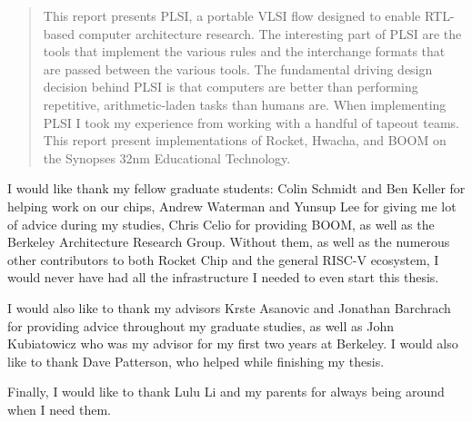\documentclass[masters2]{ucbthesis}
\begin{document}
\begin{frontmatter}

\tableofcontents
\clearpage
\listoffigures

\begin{abstract}
This report presents PLSI, a portable VLSI flow designed to enable RTL-based
computer architecture research.  The interesting part of PLSI are the tools
that implement the various rules and the interchange formats that are passed
between the various tools.  The fundamental driving design decision behind PLSI
is that computers are better than performing repetitive, arithmetic-laden tasks
than humans are.  When implementing PLSI I took my experience from working with
a handful of tapeout teams.  This report present implementations of Rocket,
Hwacha, and BOOM on the Synopses 32nm Educational Technology.
\end{abstract}

\begin{acknowledgements}
I would like thank my fellow graduate students: Colin Schmidt and Ben Keller
for helping work on our chips, Andrew Waterman and Yunsup Lee for giving me lot
of advice during my studies, Chris Celio for providing BOOM, as well as the
Berkeley Architecture Research Group.  Without them, as well as the numerous
other contributors to both Rocket Chip and the general RISC-V ecosystem, I
would never have had all the infrastructure I needed to even start this thesis.

I would also like to thank my advisors Krste Asanovic and Jonathan Barchrach
for providing advice throughout my graduate studies, as well as John
Kubiatowicz who was my advisor for my first two years at Berkeley.  I would
also like to thank Dave Patterson, who helped while finishing my thesis.

Finally, I would like to thank Lulu Li and my parents for always being around
when I need them.
\end{acknowledgements}

\end{frontmatter}

\pagestyle{headings}





\end{document}
